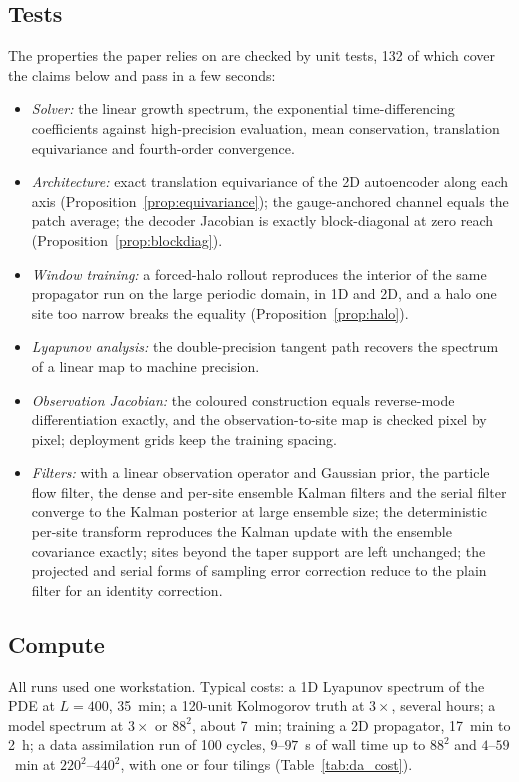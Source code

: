 \subsection{Tests}

The properties the paper relies on are checked by unit tests, 132 of which
cover the claims below and pass in a few seconds:
\begin{itemize}
\item \emph{Solver:} the linear growth spectrum, the exponential
  time-differencing coefficients against high-precision evaluation, mean
  conservation, translation equivariance and fourth-order convergence.
\item \emph{Architecture:} exact translation equivariance of the 2D
  autoencoder along each axis (Proposition~\ref{prop:equivariance}); the
  gauge-anchored channel equals the patch average; the decoder Jacobian is
  exactly block-diagonal at zero reach (Proposition~\ref{prop:blockdiag}).
\item \emph{Window training:} a forced-halo rollout reproduces the
  interior of the same propagator run on the large periodic domain, in 1D
  and 2D, and a halo one site too narrow breaks the equality
  (Proposition~\ref{prop:halo}).
\item \emph{Lyapunov analysis:} the double-precision tangent path
  recovers the spectrum of a linear map to machine precision.
\item \emph{Observation Jacobian:} the coloured construction equals
  reverse-mode differentiation exactly, and the observation-to-site map
  is checked pixel by pixel; deployment grids keep the training spacing.
\item \emph{Filters:} with a linear observation operator and Gaussian
  prior, the particle flow filter, the dense and per-site ensemble Kalman
  filters and the serial filter converge to the Kalman posterior at large
  ensemble size; the deterministic per-site transform reproduces the
  Kalman update with the ensemble covariance exactly; sites beyond the
  taper support are left unchanged; the projected and serial forms of
  sampling error correction reduce to the plain filter for an identity
  correction.
\end{itemize}

\subsection{Compute}

All runs used one workstation. Typical costs: a 1D Lyapunov spectrum of
the PDE at $L=400$, 35~min; a 120-unit Kolmogorov truth at $3\times$, several
hours; a model spectrum at $3\times$ or $88^2$, about 7~min; training a 2D
propagator, 17~min to 2~h; a data assimilation run of 100 cycles,
$9$--$97$~s of wall time up to $88^2$ and $4$--$59$~min at $220^2$--$440^2$, with one or four
tilings (Table~\ref{tab:da_cost}).


